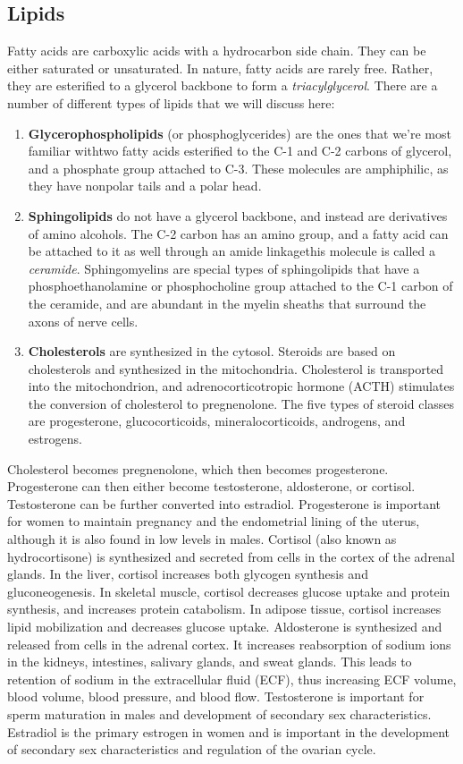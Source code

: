 \documentclass{article}
\theoremstyle{plain}%
\theoremstyle{definition}
\theoremstyle{remark}
\begin{document}
\subsection{Lipids}
Fatty acids are carboxylic acids with a hydrocarbon side chain. They can be either saturated or unsaturated. In nature, fatty acids are rarely free. Rather, they are esterified to a glycerol backbone to form a \textit{triacylglycerol}. There are a number of different types of lipids that we will discuss here:
\begin{enumerate}
	\item \textbf{Glycerophospholipids} (or phosphoglycerides) are the ones that we're most familiar with\textemdash two fatty acids esterified to the C-1 and C-2 carbons of glycerol, and a phosphate group attached to C-3. These molecules are amphiphilic, as they have nonpolar tails and a polar head.
	\item \textbf{Sphingolipids} do not have a glycerol backbone, and instead are derivatives of amino alcohols. The C-2 carbon has an amino group, and a fatty acid can be attached to it as well through an amide linkage\textemdash this molecule is called a \textit{ceramide}. Sphingomyelins are special types of sphingolipids that have a phosphoethanolamine or phosphocholine group attached to the C-1 carbon of the ceramide, and are abundant in the myelin sheaths that surround the axons of nerve cells.
	\item \textbf{Cholesterols} are synthesized in the cytosol. Steroids are based on cholesterols and synthesized in the mitochondria. Cholesterol is transported into the mitochondrion, and adrenocorticotropic hormone (ACTH) stimulates the conversion of cholesterol to pregnenolone. The five types of steroid classes are progesterone, glucocorticoids, mineralocorticoids, androgens, and estrogens.
\end{enumerate}
\noindent Cholesterol becomes pregnenolone, which then becomes progesterone. Progesterone can then either become testosterone, aldosterone, or cortisol. Testosterone can be further converted into estradiol. Progesterone is important for women to maintain pregnancy and the endometrial lining of the uterus, although it is also found in low levels in males. Cortisol (also known as hydrocortisone) is synthesized and secreted from cells in the cortex of the adrenal glands. In the liver, cortisol increases both glycogen synthesis and gluconeogenesis. In skeletal muscle, cortisol decreases glucose uptake and protein synthesis, and increases protein catabolism. In adipose tissue, cortisol increases lipid mobilization and decreases glucose uptake. Aldosterone is synthesized and released from cells in the adrenal cortex. It increases reabsorption of sodium ions in the kidneys, intestines, salivary glands, and sweat glands. This leads to retention of sodium in the extracellular fluid (ECF), thus increasing ECF volume, blood volume, blood pressure, and blood flow. Testosterone is important for sperm maturation in males and development of secondary sex characteristics. Estradiol is the primary estrogen in women and is important in the development of secondary sex characteristics and regulation of the ovarian cycle. \\
\end{document}
